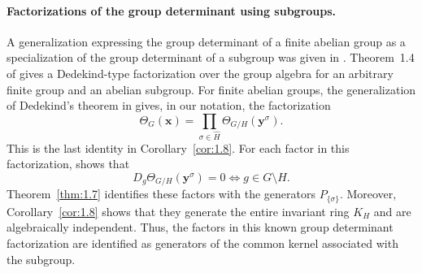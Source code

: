\documentclass[12pt,a4paper]{article}
\theoremstyle{definition}
\numberwithin{definition}{section}
\begin{document}
\paragraph{Factorizations of the group determinant using subgroups.}
A generalization expressing the group determinant of a finite abelian
group as a specialization of the group determinant of a subgroup was given
in \cite[Theorem~1.4]{Yamaguchi2017Dedekind}.
Theorem~1.4 of \cite{Yamaguchi2019Study} gives a Dedekind-type factorization
over the group algebra for an arbitrary finite group and an abelian subgroup.
For finite abelian groups, the generalization of Dedekind's theorem in
\cite[Theorem~1.1]{MR4814714} gives, in our notation, the factorization
\[
\Theta_G(\bm x)
=\prod_{\sigma\in\widehat H}\Theta_{G/H}(\bm y^\sigma).
\]
This is the last identity in Corollary~\ref{cor:1.8}.
For each factor in this factorization, \cite[Theorem~5]{Yamaguchi13022026}
shows that
\[
D_g\Theta_{G/H}(\bm y^\sigma)=0
\iff g\in G\setminus H.
\]
Theorem~\ref{thm:1.7} identifies these factors with the generators
$P_{\{\sigma\}}$.
Moreover, Corollary~\ref{cor:1.8} shows that they generate the entire
invariant ring $K_H$ and are algebraically independent.
Thus, the factors in this known group determinant factorization are
identified as generators of the common kernel associated with the subgroup.
\end{document}
